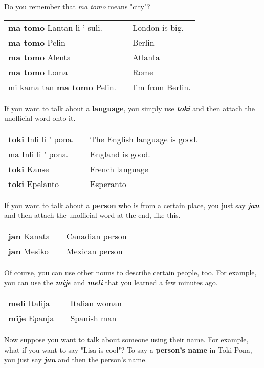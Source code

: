 Do you remember that \textit{ma tomo} means "city"? 

\begin{supertabular}{p{5,5cm}|ll}
\textbf{ma tomo} Lantan li ' suli. && London is big. \\
\textbf{ma tomo} Pelin && Berlin \\
\textbf{ma tomo} Alenta && Atlanta \\
\textbf{ma tomo} Loma && Rome \\
mi kama tan \textbf{ma tomo} Pelin. && I'm from Berlin. \\
\end{supertabular} 

If you want to talk about a \textbf{language}, you simply use \textbf{\textit{toki}} and then attach the unofficial word onto it. 

\begin{supertabular}{p{5,5cm}|ll}
\textbf{toki} Inli li ' pona. && The English language is good. \\
ma Inli li ' pona. && England is good. \\
\textbf{toki} Kanse && French language \\
\textbf{toki} Epelanto && Esperanto \\
\end{supertabular} 

If you want to talk about a \textbf{person} who is from a certain place, you just say \textbf{\textit{jan}} and then attach the unofficial word at the end, like this. 

\begin{supertabular}{p{5,5cm}|ll}
\textbf{jan} Kanata && Canadian person \\
\textbf{jan} Mesiko && Mexican person \\
\end{supertabular} 

Of course, you can use other nouns to describe certain people, too. 
For example, you can use the \textbf{\textit{mije}} and \textbf{\textit{meli}} that you learned a few minutes ago. 

\begin{supertabular}{p{5,5cm}|ll}
\textbf{meli} Italija && Italian woman \\
\textbf{mije} Epanja && Spanish man \\
\end{supertabular} 

Now suppose you want to talk about someone using their name. 
For example, what if you want to say "Lisa is cool"? 
To say a \textbf{person's name} in Toki Pona, you just say \textbf{\textit{jan}} and then the person's name. 

